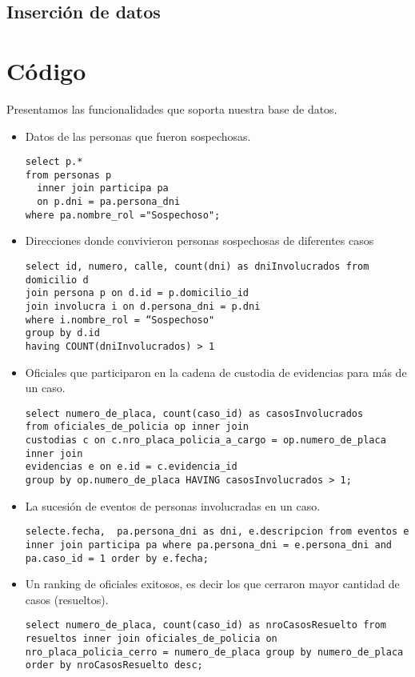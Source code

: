 \documentclass[10pt,a4paper]{article}
\begin{document}
\subsection{Inserción de datos}

\section{Código}
Presentamos las funcionalidades que soporta nuestra base de datos.
\begin{itemize}
\item Datos de las personas que fueron sospechosas.
\begin{verbatim}
select p.* 
from personas p 
  inner join participa pa 
  on p.dni = pa.persona_dni 
where pa.nombre_rol ="Sospechoso";
\end{verbatim}
\item Direcciones donde convivieron personas sospechosas de diferentes casos
\begin{verbatim}
select id, numero, calle, count(dni) as dniInvolucrados from domicilio d
join persona p on d.id = p.domicilio_id
join involucra i on d.persona_dni = p.dni
where i.nombre_rol = “Sospechoso"
group by d.id
having COUNT(dniInvolucrados) > 1
\end{verbatim}
\item Oficiales que participaron en la cadena de custodia de evidencias para más de un
caso.
\begin{verbatim}
select numero_de_placa, count(caso_id) as casosInvolucrados
from oficiales_de_policia op inner join 
custodias c on c.nro_placa_policia_a_cargo = op.numero_de_placa inner join 
evidencias e on e.id = c.evidencia_id 
group by op.numero_de_placa HAVING casosInvolucrados > 1;
\end{verbatim}
\item La sucesión de eventos de personas involucradas en un caso.
\begin{verbatim}
selecte.fecha,  pa.persona_dni as dni, e.descripcion from eventos e inner join participa pa where pa.persona_dni = e.persona_dni and pa.caso_id = 1 order by e.fecha;
\end{verbatim}
\item Un ranking de oficiales exitosos, es decir los que cerraron mayor cantidad de casos
(resueltos).
\begin{verbatim}
select numero_de_placa, count(caso_id) as nroCasosResuelto from resueltos inner join oficiales_de_policia on nro_placa_policia_cerro = numero_de_placa group by numero_de_placa order by nroCasosResuelto desc;

\end{verbatim}
\end{itemize}
\end{document}
